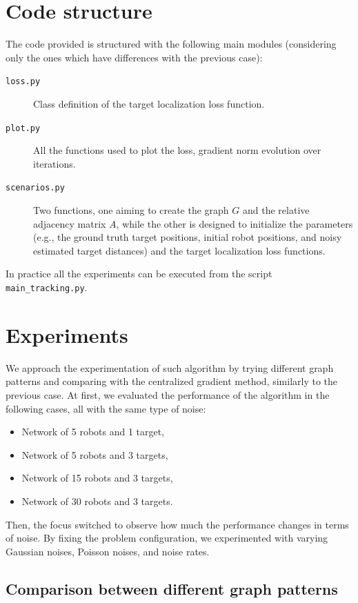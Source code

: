 \documentclass[a4paper,11pt,oneside]{book}
\begin{document}
\section{Code structure}
The code provided is structured with the following main modules (considering only the ones which have differences with the previous case):
\begin{description}
      \item[\texttt{loss.py}] Class definition of the target localization loss function.
      \item[\texttt{plot.py}] All the functions used to plot the loss, gradient norm evolution over iterations.
      \item[\texttt{scenarios.py}] Two functions, one aiming to create the graph $G$ and the relative adjacency matrix $A$, while the other is designed to initialize the parameters (e.g., the ground truth target positions, initial robot positions, and noisy estimated target distances) and the target localization loss functions.
\end{description}
In practice all the experiments can be executed from the script \texttt{main\_tracking.py}.

\section{Experiments}

We approach the experimentation of such algorithm by trying different graph patterns and comparing with the centralized gradient method, similarly to the previous case. At first, we evaluated the performance of the algorithm in the following cases, all with the same type of noise:
\begin{itemize}
      \item Network of 5 robots and 1 target,
      \item Network of 5 robots and 3 targets,
      \item Network of 15 robots and 3 targets,
      \item Network of 30 robots and 3 targets.
\end{itemize}

Then, the focus switched to observe how much the performance changes in terms of noise. By fixing the problem configuration, we experimented with varying Gaussian noises, Poisson noises, and noise rates.


\subsection{Comparison between different graph patterns}
\end{document}
